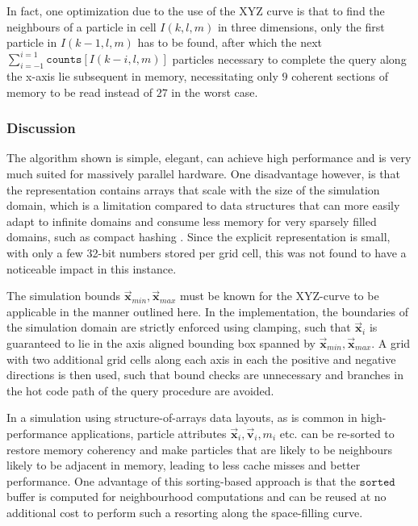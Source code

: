 \documentclass[oneside, a4paper]{book}
\newcommand\vek[1]{\vec{\bm{#1}}}
\begin{document}
\begin{appendices}
    In fact, one optimization due to the use of the XYZ curve is that to find the neighbours of a particle in cell $I(k,l,m)$ in three dimensions, only the first particle in $I(k-1, l, m)$ has to be found, after which the next $\sum_{i=-1}^{i=1}\texttt{counts}[I(k-i,l,m)]$ particles necessary to complete the query along the x-axis lie subsequent in memory, necessitating only $9$ coherent sections of memory to be read instead of $27$ in the worst case.

    \subsubsection{Discussion}
    The algorithm shown \autocite{hoetzlein-rama-counting-sort} is simple, elegant, can achieve high performance and is very much suited for massively parallel hardware. One disadvantage however, is that the representation contains arrays that scale with the size of the simulation domain, which is a limitation compared to data structures that can more easily adapt to infinite domains and consume less memory for very sparsely filled domains, such as compact hashing \autocites{tutorial2019}{compressed-neighbour-lists}. Since the explicit representation is small, with only a few 32-bit numbers stored per grid cell, this was not found to have a noticeable impact in this instance.

    The simulation bounds $\vek{x}_{min},\vek{x}_{max}$ must be known for the XYZ-curve to be applicable in the manner outlined here. In the implementation, the boundaries of the simulation domain are strictly enforced using clamping, such that $\vek{x}_i$ is guaranteed to lie in the axis aligned bounding box spanned by $\vek{x}_{min},\vek{x}_{max}$. A grid with two additional grid cells along each axis in each the positive and negative directions is then used, such that bound checks are unnecessary and branches in the hot code path of the query procedure are avoided.
    
    In a simulation using structure-of-arrays data layouts, as is common in high-performance applications, particle attributes $\vek{x}_i, \vek{v}_i, m_i$ etc. can be re-sorted to restore memory coherency and make particles that are likely to be neighbours likely to be adjacent in memory, leading to less cache misses and better performance. One advantage of this sorting-based approach is that the $\texttt{sorted}$ buffer is computed for neighbourhood computations and can be reused at no additional cost to perform such a resorting along the space-filling curve.



\end{appendices}

\printbibliography[
  heading=bibintoc,
  title={Bibliography}
]
\end{document}
